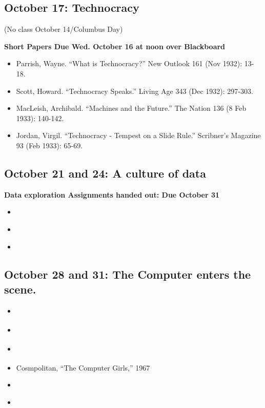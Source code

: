 \subsection{October 17: Technocracy}

(No class October 14/Columbus Day)

\textbf{Short Papers Due Wed. October 16 at noon over Blackboard}

\begin{itemize}
\item
  Parrish, Wayne. ``What is Technocracy?'' New Outlook 161 (Nov 1932):
  13-18.
\item
  Scott, Howard. ``Technocracy Speaks.'' Living Age 343 (Dec 1932):
  297-303.
\item
  MacLeish, Archibald. ``Machines and the Future.'' The Nation 136 (8
  Feb 1933): 140-142.
\item
  Jordan, Virgil. ``Technocracy - Tempest on a Slide Rule.'' Scribner's
  Magazine 93 (Feb 1933): 65-69.
\end{itemize}

\subsection{October 21 and 24: A culture of data}

\textbf{Data exploration Assignments handed out: Due October 31}

\begin{itemize}
\item
  \cite[Chapters 5 and 6]{igo_averaged_2007}
\item
  \cite[pp. 1-173]{lemann_big_1999}
\item
  \cite[pp 193-229]{ohmer_george_2006}
\end{itemize}

\subsection{October 28 and 31: The Computer enters the scene.}

\begin{itemize}
\item
  \cite{bush_as_1945}
\item
  \cite{bush_memex_1991}
\item
  \cite{lubar_not_1992}
\item
  Cosmpolitan, ``The Computer Girls,'' 1967
\item
  \cite[Chapter TBD]{ensmenger_computer_2010}
\item
  \cite{light_when_1999}
\end{itemize}

